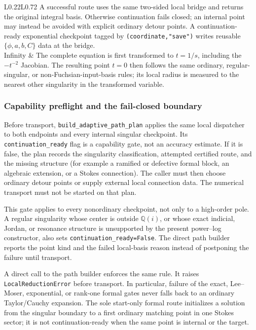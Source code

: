 \documentclass[11pt]{article}
\begin{document}
\begin{longtable}{L{0.22\textwidth}L{0.72\textwidth}}
A successful route uses
the same two-sided local bridge and returns the original integral basis.  Otherwise
continuation fails closed; an internal point may instead be avoided with explicit ordinary
detour points.  A continuation-ready exponential checkpoint tagged by
\texttt{(coordinate,"save")} writes reusable $\{\phi,a,b,C\}$ data at the bridge. \\
Infinity & The complete equation is first transformed to $t=1/s$, including the
$-t^{-2}$ Jacobian.  The resulting point $t=0$ then follows the same ordinary,
regular-singular, or non-Fuchsian-input-basis rules; its local radius is measured to the
nearest other singularity in the transformed variable. \\
\bottomrule
\end{longtable}
\normalsize

\subsubsection{Capability preflight and the fail-closed boundary}

Before transport, \texttt{build\_adaptive\_path\_plan} applies the same local dispatcher to
both endpoints and every internal singular checkpoint.  Its
\texttt{continuation\_ready} flag is a capability gate, not an accuracy estimate.  If it is
false, the plan records the singularity classification, attempted certified route, and the
missing structure (for example a ramified or defective formal block, an algebraic extension,
or a Stokes connection).  The caller must then choose ordinary detour points or supply external
local connection data.  The numerical transport must not be started on that plan.

This gate applies to every nonordinary checkpoint, not only to a high-order pole.  A regular
singularity whose center is outside $\mathbb Q(i)$, or whose exact indicial, Jordan, or
resonance structure is unsupported by the present power--log constructor, also sets
\texttt{continuation\_ready=False}.  The direct path builder reports the point kind and the
failed local-basis reason instead of postponing the failure until transport.

A direct call to the path builder enforces the same rule.  It raises
\texttt{LocalReductionError} before transport.  In particular, failure of the exact, Lee--Moser, exponential,
or rank-one formal gates never falls back to an ordinary Taylor/Cauchy expansion.  The sole
start-only formal route initializes a solution from the singular boundary to a first ordinary
matching point in one Stokes sector; it is not continuation-ready when the same point is
internal or the target.
\end{document}
